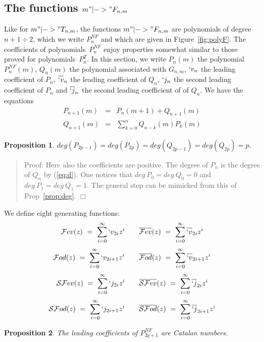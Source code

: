\documentclass[preprint,authoryear]{elsarticle}
\newenvironment{proof}[1]{\begin{quotation}\noindent\textsf{Proof:} #1}{\(\Box\)\end{quotation}}
\newtheorem{prop}{Proposition}
\newcommand{\Fev}{\mathcal{F}ev}
\newcommand{\Fevb}{\overline{\mathcal{F}ev}}
\newcommand{\Fod}{\mathcal{F}od}
\newcommand{\Fodb}{\overline{\mathcal{F}od}}
\newcommand{\SFev}{\mathcal{SF}ev}
\newcommand{\SFevb}{\overline{\mathcal{SF}ev}}
\newcommand{\SFod}{\mathcal{SF}od}
\newcommand{\SFodb}{\overline{\mathcal{SF}od}}
\newcommand{\phib}[1]{\overline{`v}_{#1}}
\newcommand{\psib}[1]{\overline{`j}_{#1}}
\begin{document}
\subsection*{The functions $m"|->" F_{n,m}$}
Like for $m "|->" T_{n,m}$, the functions $m "|->" F_{n,m}$ are polynomials of degree $n+1
\div 2$, which we write $P^{NF}_n$ and which are given in Figure~\ref{fig:polyF}.  The
coefficients of polynomials~$P^{NF}_n$ enjoy properties somewhat similar to those proved
for polynomials~$P^T_n$.  In this section, we write $P_n(m)$ the polynomial $P_n^{NF}(m)$,
$Q_n(m)$ the polynomial associated with $G_{n,m}$, $`v_n$ the leading coefficient of $P_n$,
$\phib{n}$ the leading coefficient of $Q_n$, $`j_n$ the second leading coefficient of
$P_n$ and $\psib{n}$ the second leading coefficient of of $Q_n$.  We have the equations
\begin{eqnarray}
  \label{eq:d}
  P_{n+1}(m) &=& P_n(m+1) + Q_{n+1}(m)\\\label{eq:e}
  Q_{n+1}(m) &=&\sum_{k=0}^nQ_{n-k}(m)P_k(m)
\end{eqnarray}
\begin{prop}\label{propNF:deg}
$deg(P_{2p-1}) = deg(P_{2p}) = deg(Q_{2p-1} )= deg(Q_{2p}) = p$.
\end{prop}
\begin{proof}{}
Here also the coefficients are positive.  The degree of $P_n$ is the degree of $Q_n$ by
(\ref{eq:d}). One notices that $deg~P_0 = deg~Q_0 = 0$ and $deg~P_1 = deg~Q_1=1$.  The
general step can be mimicked from this of Prop~\ref{prop:deg}.
\end{proof}
We define eight generating
functions:
\begin{displaymath}
  \Fev(z) \ = \ \sum_{i=0}^{\infty} `v_{2i} z^i \qquad
  \Fevb(z) \ = \ \sum_{i=0}^{\infty} \phib{2i}z^i
\end{displaymath}
\begin{displaymath}
  \Fod(z) \ = \  \sum_{i=0}^{\infty} `v_{2i+1} z^i \qquad
  \Fodb(z) \ =\ \sum_{i=0}^{\infty} \phib{2i+1}z^i
\end{displaymath}
\begin{displaymath}
  \SFev(z) \ = \ \sum_{i=0}^{\infty} `j_{2i} z^i \qquad
  \SFevb(z) \ = \ \sum_{i=0}^{\infty} \psib{2i}z^i
\end{displaymath}
 \begin{displaymath}
  \SFod(z) \ = \  \sum_{i=0}^{\infty} `j_{2i+1} z^i \qquad
  \SFodb(z) \ =\ \sum_{i=0}^{\infty} \psib{2i+1}z^i
\end{displaymath}
 \begin{prop}
    The leading coefficients of $P^{NF}_{2q+1}$ are Catalan numbers.
  \end{prop}
\end{document}
